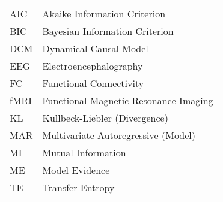 \documentclass[a4paper,10pt]{article}
\begin{document}
\begin{tabular}{l l}
        AIC     &       Akaike Information Criterion \\
        BIC     &       Bayesian Information Criterion \\
	DCM	&	Dynamical Causal Model\\
	EEG	&	Electroencephalography\\
	FC	&	Functional Connectivity\\
	fMRI	&	Functional Magnetic Resonance Imaging\\
	KL	&	Kullbeck-Liebler (Divergence)\\
	MAR	&	Multivariate Autoregressive (Model)\\
	MI	&	Mutual Information\\
	ME	&	Model Evidence\\
	TE	&	Transfer Entropy
\end{tabular}

\printbibliography
\end{document}
